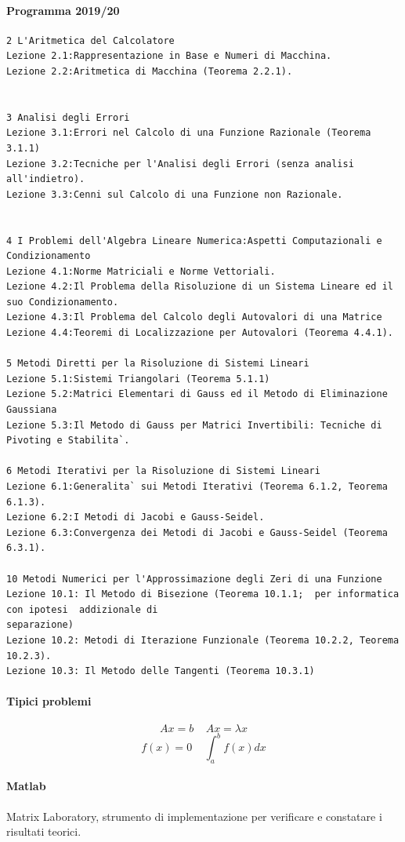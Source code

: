 \documentclass[10pt]{book}
\begin{document}
\paragraph{Programma 2019/20} \begin{verbatim}
2 L'Aritmetica del Calcolatore
Lezione 2.1:Rappresentazione in Base e Numeri di Macchina.
Lezione 2.2:Aritmetica di Macchina (Teorema 2.2.1).


3 Analisi degli Errori
Lezione 3.1:Errori nel Calcolo di una Funzione Razionale (Teorema 3.1.1)
Lezione 3.2:Tecniche per l'Analisi degli Errori (senza analisi all'indietro).
Lezione 3.3:Cenni sul Calcolo di una Funzione non Razionale.


4 I Problemi dell'Algebra Lineare Numerica:Aspetti Computazionali e Condizionamento
Lezione 4.1:Norme Matriciali e Norme Vettoriali.
Lezione 4.2:Il Problema della Risoluzione di un Sistema Lineare ed il
suo Condizionamento.
Lezione 4.3:Il Problema del Calcolo degli Autovalori di una Matrice
Lezione 4.4:Teoremi di Localizzazione per Autovalori (Teorema 4.4.1).

5 Metodi Diretti per la Risoluzione di Sistemi Lineari
Lezione 5.1:Sistemi Triangolari (Teorema 5.1.1)
Lezione 5.2:Matrici Elementari di Gauss ed il Metodo di Eliminazione
Gaussiana
Lezione 5.3:Il Metodo di Gauss per Matrici Invertibili: Tecniche di
Pivoting e Stabilita`.

6 Metodi Iterativi per la Risoluzione di Sistemi Lineari
Lezione 6.1:Generalita` sui Metodi Iterativi (Teorema 6.1.2, Teorema 6.1.3). 
Lezione 6.2:I Metodi di Jacobi e Gauss-Seidel. 
Lezione 6.3:Convergenza dei Metodi di Jacobi e Gauss-Seidel (Teorema 6.3.1).

10 Metodi Numerici per l'Approssimazione degli Zeri di una Funzione
Lezione 10.1: Il Metodo di Bisezione (Teorema 10.1.1;  per informatica con ipotesi  addizionale di
separazione)
Lezione 10.2: Metodi di Iterazione Funzionale (Teorema 10.2.2, Teorema 10.2.3).
Lezione 10.3: Il Metodo delle Tangenti (Teorema 10.3.1)

\end{verbatim}
\paragraph{Tipici problemi} $$Ax = b\:\:\:\:\:Ax = \lambda x$$ $$f(x) = 0\:\:\:\:\:\int_a^bf(x) dx$$
\paragraph{Matlab} Matrix Laboratory, strumento di implementazione per verificare e constatare i risultati teorici.
\pagebreak
\end{document}
